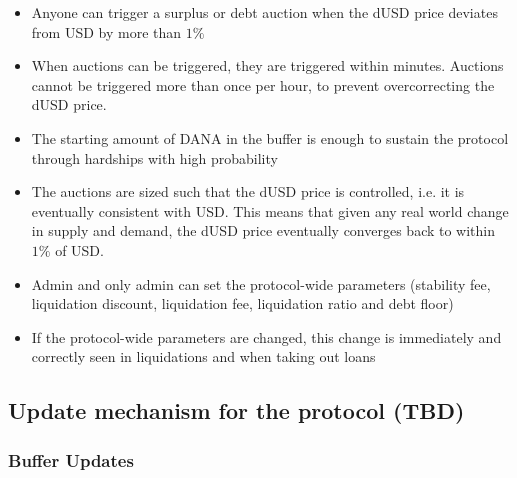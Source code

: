 \documentclass{article} %
\begin{document}
\begin{itemize}
  \item Anyone can trigger a surplus or debt auction when the dUSD price
    deviates from USD by more than $1\%$
  \item When auctions can be triggered, they are triggered within minutes.
    Auctions cannot be triggered more than once per hour, to prevent
    overcorrecting the dUSD price.
  \item The starting amount of DANA in the buffer is enough to sustain the
    protocol through hardships with high probability
  \item The auctions are sized such that the dUSD price is controlled, i.e. it
    is eventually consistent with USD.
    This means that given any real world change in supply and demand, the dUSD
    price eventually converges back to within $1\%$ of USD.
  \item Admin and only admin can set the protocol-wide parameters (stability
    fee, liquidation discount, liquidation fee, liquidation ratio and debt
    floor)
  \item If the protocol-wide parameters are changed, this change is immediately
    and correctly seen in liquidations and when taking out loans
\end{itemize}

\subsection{Update mechanism for the protocol (TBD)}


\subsubsection{Buffer Updates}
\end{document}
